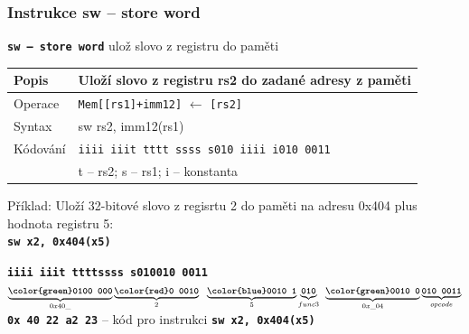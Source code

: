 \documentclass{beamer}
\begin{document}
\begin{frame}
\frametitle{Instrukce sw -- store word}

\textbf{\texttt{sw -- store word}} ulož slovo z registru do paměti

\bigskip

\begin{tabular}{|l|l|}\hline
Popis & Uloží slovo z registru rs2 do zadané adresy z paměti \\ \hline
Operace & \texttt{Mem[[rs1]+imm12]} $\leftarrow$ \texttt{[rs2]} \\ \hline
Syntax & sw rs2, imm12(rs1) \\ \hline
Kódování & \texttt{iiii iiit tttt ssss s010 iiii i010 0011} \\ 
 & t -- rs2; s -- rs1; i -- konstanta \\ \hline
\end{tabular}

\bigskip

Příklad: Uloží 32-bitové slovo z regisrtu 2 do paměti na adresu 0x404 plus hodnota registru 5:\\
\textbf{\texttt{sw x2, 0x404(x5)}}

\textbf{\texttt{{\color{green}iiii iii}\hspace{0.08cm}\color{red}t tttt}}\phantom{x}\hspace{0.13cm}\textbf{\texttt{\color{blue}ssss s}}\hspace{0.1cm}\textbf{\texttt{010\hspace{0.05cm}010 0011}}\\
$\underbrace{\textbf{\texttt{\color{green}0100 000}}}_{0x40\_}
\underbrace{\textbf{\texttt{\color{red}0 0010}}}_{2}
\texttt{ }\underbrace{\textbf{\texttt{\color{blue}0010 1}}}_{5}
\underbrace{\textbf{\texttt{010}}}_{func3}\phantom{i}\underbrace{\textbf{\texttt{\color{green}0010 0}}}_{0x \_04}
\underbrace{\textbf{\texttt{010 0011}}}_{opcode}$\\

\textbf{\texttt{0x 40 22 a2 23}} -- kód pro instrukci \textbf{\texttt{sw x2, 0x404(x5)}}

\end{frame}
\end{document}
